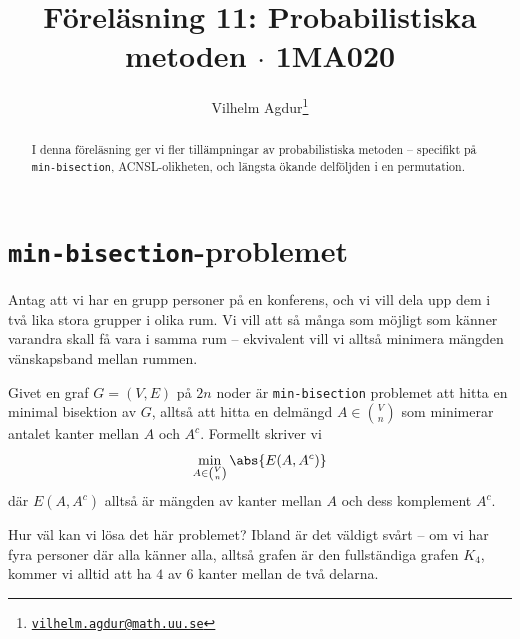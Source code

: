 \documentclass[nobib]{tufte-handout}
\title{Föreläsning 11: Probabilistiska metoden $\cdot$ 1MA020}
\author[Vilhelm Agdur]{Vilhelm Agdur\thanks{\href{mailto:vilhelm.agdur@math.uu.se}{\nolinkurl{vilhelm.agdur@math.uu.se}}}}
\begin{document}

\maketitle%

\begin{abstract}
\noindent
I denna föreläsning ger vi fler tillämpningar av probabilistiska metoden -- specifikt på \texttt{min-bisection}, ACNSL-olikheten, och längsta ökande delföljden i en permutation.
\end{abstract}

\section{\texttt{min-bisection}-problemet}

Antag att vi har en grupp personer på en konferens, och vi vill dela upp dem i två lika stora grupper i olika rum. Vi vill att så många som möjligt som känner varandra skall få vara i samma rum -- ekvivalent vill vi alltså minimera mängden vänskapsband mellan rummen.

\begin{definition}
  Givet en graf $G = (V, E)$ på $2n$ noder är \texttt{min-bisection} problemet att hitta en minimal bisektion av $G$, alltså att hitta en delmängd $A \in \binom{V}{n}$ som minimerar antalet kanter mellan $A$ och $A^c$. Formellt skriver vi
  $$\min_{A \in \binom{V}{n}} \abs{E(A, A^c)}$$
  där $E(A, A^c)$ alltså är mängden av kanter mellan $A$ och dess komplement $A^c$.
\end{definition}

Hur väl kan vi lösa det här problemet? Ibland är det väldigt svårt -- om vi har fyra personer där alla känner alla, alltså grafen är den fullständiga grafen $K_4$, kommer vi alltid att ha $4$ av $6$ kanter mellan de två delarna.
\end{document}
